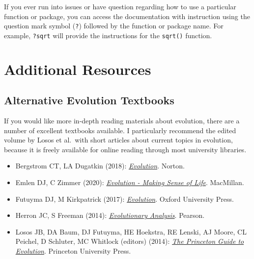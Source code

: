 \documentclass[
]{book}
\begin{document}
If you ever run into issues or have question regarding how to use a particular function or package, you can access the documentation with instruction using the question mark symbol (\texttt{?}) followed by the function or package name. For example, \texttt{?sqrt} will provide the instructions for the \texttt{sqrt()} function.

\hypertarget{additional-resources}{%
\section{Additional Resources}\label{additional-resources}}

\hypertarget{alternative-evolution-textbooks}{%
\subsection{Alternative Evolution Textbooks}\label{alternative-evolution-textbooks}}

If you would like more in-depth reading materials about evolution, there are a number of excellent textbooks available. I particularly recommend the edited volume by Losos et al.~with short articles about current topics in evolution, because it is freely available for online reading through most university libraries.

\begin{itemize}
\item
  Bergstrom CT, LA Dugatkin (2018): \href{https://wwnorton.com/books/Evolution/}{\emph{Evolution}}. Norton.
\item
  Emlen DJ, C Zimmer (2020): \href{https://www.macmillanlearning.com/college/us/product/Evolution/p/1319079865}{\emph{Evolution - Making Sense of Life}}. MacMillan.
\item
  Futuyma DJ, M Kirkpatrick (2017): \href{https://global.oup.com/ushe/product/evolution-9781605356051?cc=us\&lang=en\&}{\emph{Evolution}}. Oxford University Press.
\item
  Herron JC, S Freeman (2014): \href{https://www.pearson.com/us/higher-education/program/Herron-Evolutionary-Analysis-5th-Edition/PGM296285.html}{\emph{Evolutionary Analysis}}. Pearson.
\item
  Losos JB, DA Baum, DJ Futuyma, HE Hoekstra, RE Lenski, AJ Moore, CL Peichel, D Schluter, MC Whitlock (editors) (2014): \href{https://k-state-primo.hosted.exlibrisgroup.com/permalink/f/1aco38j/01KSU_ALMA51277244700002401}{\emph{The Princeton Guide to Evolution}}. Princeton University Press.
\end{itemize}
\end{document}
